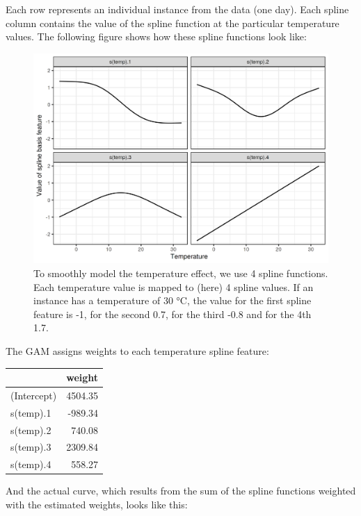 \documentclass[12pt,]{krantz}
\begin{document}
Each row represents an individual instance from the data (one day). Each
spline column contains the value of the spline function at the
particular temperature values. The following figure shows how these
spline functions look like:

\begin{figure}

{\centering \includegraphics[width=\textwidth]{images/splines-1} 

}

\caption{To smoothly model the temperature effect, we use 4 spline functions. Each temperature value is mapped to (here) 4 spline values. If an instance has a temperature of 30 °C, the value for the first spline feature is -1, for the second 0.7, for the third -0.8 and for the 4th 1.7.}\label{fig:splines}
\end{figure}

The GAM assigns weights to each temperature spline feature:

\begin{tabular}{l|r}
\hline
  & weight\\
\hline
(Intercept) & 4504.35\\
\hline
s(temp).1 & -989.34\\
\hline
s(temp).2 & 740.08\\
\hline
s(temp).3 & 2309.84\\
\hline
s(temp).4 & 558.27\\
\hline
\end{tabular}

And the actual curve, which results from the sum of the spline functions
weighted with the estimated weights, looks like this:
\end{document}
